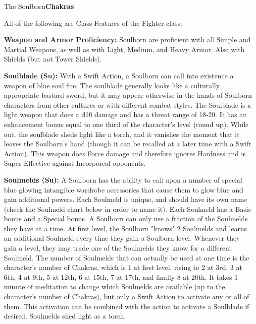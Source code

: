 \begin{extraclasstable}{The Soulborn}{\textbf{Chakras}}
\end{extraclasstable}

\ClassFeatures
All of the following are Class Features of the Fighter class:

\textbf{Weapon and Armor Proficiency:} Soulborn are proficient with all Simple and Martial Weapons, as well as with Light, Medium, and Heavy Armor. Also with Shields (but not Tower Shields). 

\textbf{Soulblade (Su):} With a Swift Action, a Soulborn can call into existence a weapon of blue soul fire. The soulblade generally looks like a culturally appropriate bastard sword, but it may appear otherwise in the hands of Soulborn characters from other cultures or with different combat styles. The Soulblade is a light weapon that does a d10 damage and has a threat range of 18-20. It has an enhancement bonus equal to one third of the character's level (round up). While out, the soulblade sheds light like a torch, and it vanishes the moment that it leaves the Soulborn's hand (though it can be recalled at a later time with a Swift Action). This weapon does Force damage and therefore ignores Hardness and is Super Effective against Incorporeal opponents. 

\textbf{Soulmelds (Su):} A Soulborn has the ability to call upon a number of special blue glowing intangible wardrobe accessories that cause them to glow blue and gain additional powers. Each Soulmeld is unique, and should have its own name (check the Soulmeld chart below in order to name it). Each Soulmeld has a Basic bonus and a Special bonus. A Soulborn can only use a fraction of the Soulmelds they have at a time. At first level, the Soulborn "knows" 2 Soulmelds and learns an additional Soulmeld every time they gain a Soulborn level. Whenever they gain a level, they may trade one of the Soulmelds they know for a different Soulmeld. The number of Soulmelds that can actually be used at one time is the character's number of Chakras, which is 1 at first level, rising to 2 at 3rd, 3 at 6th, 4 at 9th, 5 at 12th, 6 at 15th, 7 at 17th, and finally 8 at 20th. It takes 1 minute of meditation to change which Soulmelds are available (up to the character's number of Chakras), but only a Swift Action to activate any or all of them. This activation can be combined with the action to activate a Soulblade if desired. Soulmelds shed light as a torch. 

